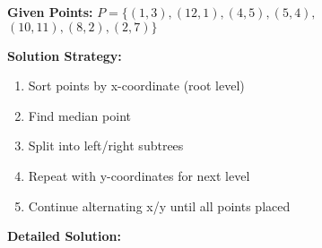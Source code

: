 \textbf{Given Points:} 
$P = \{(1,3), (12,1), (4,5), (5,4),$ \\
\hspace*{1cm} $(10,11), (8,2), (2,7)\}$

\textbf{Solution Strategy:}
\begin{enumerate}[leftmargin=*,noitemsep]
    \item Sort points by x-coordinate (root level)
    \item Find median point
    \item Split into left/right subtrees
    \item Repeat with y-coordinates for next level
    \item Continue alternating x/y until all points placed
\end{enumerate}

\textbf{Detailed Solution:}

